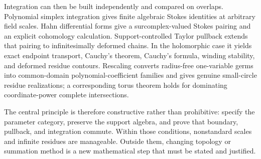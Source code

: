 \documentclass[11pt,letterpaper]{article}
\theoremstyle{definition}
\theoremstyle{remark}
\numberwithin{equation}{section}
\begin{document}
Integration can then be built independently and compared on overlaps. Polynomial simplex integration gives finite algebraic Stokes identities at arbitrary field scales. Hahn differential forms give a surcomplex-valued Stokes pairing and an explicit cohomology calculation. Support-controlled Taylor pullback extends that pairing to infinitesimally deformed chains. In the holomorphic case it yields exact endpoint transport, Cauchy's theorem, Cauchy's formula, winding stability, and deformed residue contours. Rescaling converts radius-free one-variable germs into common-domain polynomial-coefficient families and gives genuine small-circle residue realizations; a corresponding torus theorem holds for dominating coordinate-power complete intersections.

The central principle is therefore constructive rather than prohibitive: specify the parameter category, preserve the support algebra, and prove that boundary, pullback, and integration commute. Within those conditions, nonstandard scales and infinite residues are manageable. Outside them, changing topology or summation method is a new mathematical step that must be stated and justified.

\appendix
\end{document}
